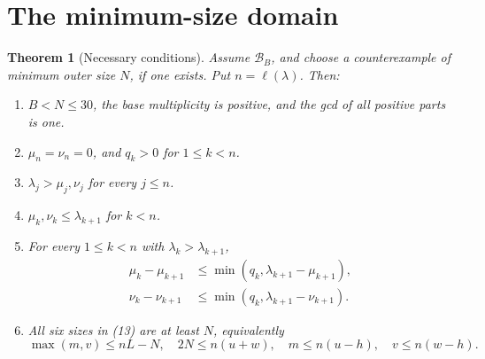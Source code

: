 \documentclass[11pt]{article}
\newtheorem{theorem}{Theorem}
\begin{document}
\section{The minimum-size domain}

\begin{theorem}[Necessary conditions]\label{thm:domain}
Assume \(\mathcal B_B\), and choose a counterexample of minimum outer size \(N\), if one exists. Put \(n=\ell(\lambda)\). Then:
\begin{enumerate}
\item \(B<N\le30\), the base multiplicity is positive, and the gcd of all positive parts is one.
\item \(\mu_n=\nu_n=0\), and \(q_k>0\) for \(1\le k<n\).
\item \(\lambda_j>\mu_j,\nu_j\) for every \(j\le n\).
\item \(\mu_k,\nu_k\le\lambda_{k+1}\) for \(k<n\).
\item For every $1\le k<n$ with $\lambda_k>\lambda_{k+1}$,
\[
\begin{split}
\mu_k-\mu_{k+1}&\le\min(q_k,\lambda_{k+1}-\mu_{k+1}),\\
\nu_k-\nu_{k+1}&\le\min(q_k,\lambda_{k+1}-\nu_{k+1}).
\end{split}                                                    \tag{16}
\]
\item All six sizes in (13) are at least \(N\), equivalently
\[
\max(m,v)\le nL-N,\quad 2N\le n(u+w),\quad
m\le n(u-h),\quad v\le n(w-h).
                                                               \tag{17}
\]
\end{enumerate}
\end{theorem}
\end{document}
